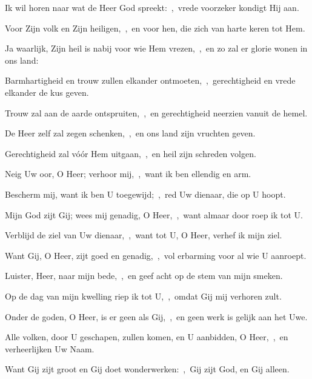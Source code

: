 \documentclass[12pt,twoside,a5paper]{article}
\begin{document}
\begin{halfparskip}

  Ik wil horen naar wat de Heer God spreekt:~\sep\ vrede voorzeker kondigt Hij aan.

  Voor Zijn volk en Zijn heiligen,~\sep\ en voor hen, die zich van harte keren tot Hem.

  Ja waarlijk, Zijn heil is nabij voor wie Hem vrezen,~\sep\ en zo zal er glorie wonen in ons land:

  Barmhartigheid en trouw zullen elkander ontmoeten,~\sep\ gerechtigheid en vrede elkander de kus geven.

  Trouw zal aan de aarde ontspruiten,~\sep\ en gerechtigheid neerzien vanuit de hemel.

  De Heer zelf zal zegen schenken,~\sep\ en ons land zijn vruchten geven.

  Gerechtigheid zal vóór Hem uitgaan,~\sep\ en heil zijn schreden volgen.
\end{halfparskip}


\begin{halfparskip}

  Neig Uw oor, O Heer; verhoor mij,~\sep\ want ik ben ellendig en arm.


  Bescherm mij, want ik ben U toegewijd;~\sep\ red Uw dienaar, die op U hoopt.

  Mijn God zijt Gij; wees mij genadig, O Heer,~\sep\ want almaar door roep ik tot U.

  Verblijd de ziel van Uw dienaar,~\sep\ want tot U, O Heer, verhef ik mijn ziel.

  Want Gij, O Heer, zijt goed en genadig,~\sep\ vol erbarming voor al wie U aanroept.

  Luister, Heer, naar mijn bede,~\sep\ en geef acht op de stem van mijn smeken.

  Op de dag van mijn kwelling riep ik tot U,~\sep\ omdat Gij mij verhoren zult.
\end{halfparskip}

\begin{halfparskip}

  Onder de goden, O Heer, is er geen als Gij,~\sep\ en geen werk is gelijk aan het Uwe.

  Alle volken, door U geschapen, zullen komen, en U aanbidden, O Heer,~\sep\ en verheerlijken Uw Naam.

  Want Gij zijt groot en Gij doet wonderwerken:~\sep\ Gij zijt God, en Gij alleen.
\end{halfparskip}
\end{document}
